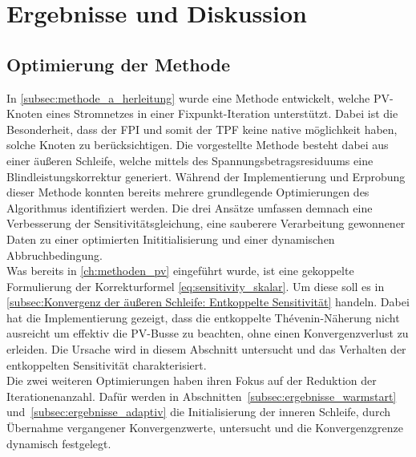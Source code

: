 \chapter{Ergebnisse und Diskussion}
\label{ch:ergebnisse}
\section{Optimierung der Methode}
\label{sec:Optimierung der Methode}


In \cref{subsec:methode_a_herleitung} wurde eine Methode entwickelt, welche PV-Knoten eines Stromnetzes in einer Fixpunkt-Iteration unterstützt.
Dabei ist die Besonderheit, dass der FPI und somit der TPF keine native möglichkeit haben, solche Knoten zu berücksichtigen.
Die vorgestellte Methode besteht dabei aus einer äußeren Schleife, welche mittels des Spannungsbetragsresiduums eine Blindleistungskorrektur generiert.
Während der Implementierung und Erprobung dieser Methode konnten bereits mehrere grundlegende Optimierungen des Algorithmus identifiziert werden.
Die drei Ansätze umfassen demnach eine Verbesserung der Sensitivitätsgleichung, eine sauberere Verarbeitung gewonnener Daten zu einer optimierten Inititialisierung und einer dynamischen Abbruchbedingung.\\

Was bereits in \cref{ch:methoden_pv} eingeführt wurde, ist eine gekoppelte Formulierung der Korrekturformel \eqref{eq:sensitivity_skalar}. 
Um diese soll es in \cref{subsec:Konvergenz der äußeren Schleife: Entkoppelte Sensitivität} handeln. 
Dabei hat die Implementierung gezeigt, dass die entkoppelte Thévenin-Näherung nicht ausreicht um effektiv die PV-Busse zu beachten, ohne einen Konvergenzverlust zu erleiden. 
Die Ursache wird in diesem Abschnitt untersucht und das Verhalten der entkoppelten Sensitivität charakterisiert.\\

Die zwei weiteren Optimierungen haben ihren Fokus auf der Reduktion der Iterationenanzahl.
Dafür werden in Abschnitten~\ref{subsec:ergebnisse_warmstart} und~\ref{subsec:ergebnisse_adaptiv} die Initialisierung der inneren Schleife, durch Übernahme vergangener Konvergenzwerte, untersucht und die Konvergenzgrenze dynamisch festgelegt.\\




